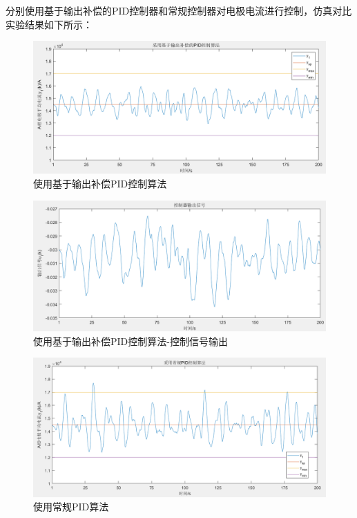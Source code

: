 \documentclass[UTF8, 12pt]{article}
\begin{document}
分别使用基于输出补偿的PID控制器和常规控制器对电极电流进行控制，仿真对比实验结果如下所示：
\begin{figure}[H]
    \centering %
    \includegraphics[width=.8\textwidth]{figure/输出补偿PID-输出信号.png} 
    \caption{使用基于输出补偿PID控制算法} %
\end{figure}
\begin{figure}[H]
    \centering %
    \includegraphics[width=.8\textwidth]{figure/输出补偿PID-控制信号.png} 
    \caption{使用基于输出补偿PID控制算法-控制信号输出} %
\end{figure}
\begin{figure}[H]
    \centering %
    \includegraphics[width=.8\textwidth]{figure/常规PID-输出信号.png} 
    \caption{使用常规PID算法} %
\end{figure}
\end{document}
